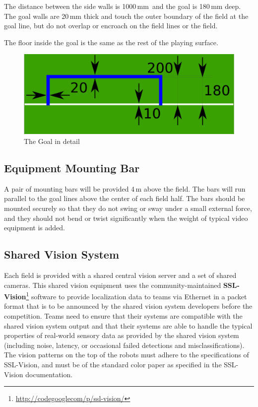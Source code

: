 The distance between the side walls is 1000\,mm\, and the goal is 180\,mm deep.
The goal walls are 20\,mm thick and touch the outer boundary of the field at
the goal line, but do not overlap or encroach on the field lines or the field.

The floor inside the goal is the same as the rest of the playing surface.

\begin{figure}[ht] %
  \centering
  \includegraphics[width=0.5\columnwidth]{img/goal_detail.png}
  \caption{The Goal in detail}
  \label{fig:sslgoal}
\end{figure}

\subsection{Equipment Mounting Bar}

A pair of mounting bars will be provided 4\,m
above the field. The bars will run parallel to the goal lines above the
center of each field half. The bars should be mounted
securely so that they do not swing or sway under a
small external force, and they should not bend or twist
significantly when the weight of typical video equipment is added.

\subsection{Shared Vision System}
Each field is provided with a shared central vision server and a set of shared
cameras. This shared vision equipment uses the community-maintained
\textbf{SSL-Vision}\footnote{\url{http://codegooglecom/p/ssl-vision/}} software
to provide localization data to teams via Ethernet in a packet format that is to
be announced by the shared vision system developers before the competition.
Teams need to ensure that their systems are compatible with the shared vision
system output and that their systems are able to handle the typical properties
of real-world sensory data as provided by the shared vision system (including
noise, latency, or occasional failed detections and misclassifications).
The vision patterns on the top of the robots must adhere to the
specifications of SSL-Vision, and must be of the standard color paper as
specified in the SSL-Vision documentation.

